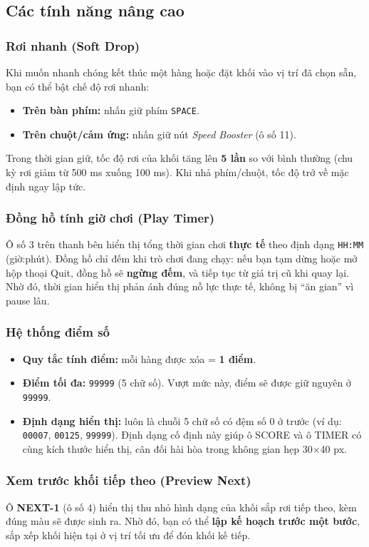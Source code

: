 \documentclass[12pt,a4paper]{article}
\begin{document}
\subsection{Các tính năng nâng cao}

\subsubsection{Rơi nhanh (Soft Drop)}
Khi muốn nhanh chóng kết thúc một hàng hoặc đặt khối vào vị trí đã chọn sẵn, bạn có thể bật chế độ rơi nhanh:
\begin{itemize}
    \item \textbf{Trên bàn phím:} nhấn giữ phím \texttt{SPACE}.
    \item \textbf{Trên chuột/cảm ứng:} nhấn giữ nút \textit{Speed Booster} (ô số 11).
\end{itemize}
Trong thời gian giữ, tốc độ rơi của khối tăng lên \textbf{5 lần} so với bình thường (chu kỳ rơi giảm từ 500 ms xuống 100 ms).
Khi nhả phím/chuột, tốc độ trở về mặc định ngay lập tức.
\subsubsection{Đồng hồ tính giờ chơi (Play Timer)}
Ô số 3 trên thanh bên hiển thị tổng thời gian chơi \textbf{thực tế} theo định dạng \texttt{HH:MM} (giờ:phút).
Đồng hồ chỉ đếm khi trò chơi đang chạy: nếu bạn tạm dừng hoặc mở hộp thoại Quit, đồng hồ sẽ \textbf{ngừng đếm}, và tiếp tục từ giá trị cũ khi quay lại.
Nhờ đó, thời gian hiển thị phản ánh đúng nỗ lực thực tế, không bị ``ăn gian'' vì pause lâu.
\subsubsection{Hệ thống điểm số}
\begin{itemize}
    \item \textbf{Quy tắc tính điểm:} mỗi hàng được xóa = \textbf{1 điểm}.
    \item \textbf{Điểm tối đa:} \texttt{99999} (5 chữ số). Vượt mức này, điểm sẽ được giữ nguyên ở \texttt{99999}.
    \item \textbf{Định dạng hiển thị:} luôn là chuỗi 5 chữ số có đệm số 0 ở trước (ví dụ: \texttt{00007}, \texttt{00125}, \texttt{99999}).
Định dạng cố định này giúp ô SCORE và ô TIMER có cùng kích thước hiển thị, cân đối hài hòa trong không gian hẹp 30$\times$40 px.
\end{itemize}

\subsubsection{Xem trước khối tiếp theo (Preview Next)}
Ô \textbf{NEXT-1} (ô số 4) hiển thị thu nhỏ hình dạng của khối sắp rơi tiếp theo, kèm đúng màu sẽ được sinh ra.
Nhờ đó, bạn có thể \textbf{lập kế hoạch trước một bước}, sắp xếp khối hiện tại ở vị trí tối ưu để đón khối kế tiếp.
\end{document}
